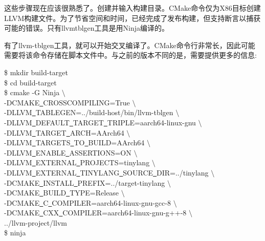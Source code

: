 这些步骤现在应该很熟悉了。创建并输入构建目录。CMake命令仅为X86目标创建LLVM构建文件。为了节省空间和时间，已经完成了发布构建，但支持断言以捕获可能的错误。只有llvmtblgen工具是用Ninja编译的。\par

有了llvm-tblgen工具，就可以开始交叉编译了。CMake命令行非常长，因此可能需要将该命令存储在脚本文件中。与之前的版本不同的是，需要提供更多的信息:\par

\begin{tcolorbox}[colback=white,colframe=black]
\$ mkdir build-target \\
\$ cd build-target \\
\$ cmake -G Ninja $\setminus$ \\
\hspace*{1cm}-DCMAKE\underline{~}CROSSCOMPILING=True $\setminus$ \\
\hspace*{1cm}-DLLVM\underline{~}TABLEGEN=../build-host/bin/llvm-tblgen $\setminus$ \\
\hspace*{1cm}-DLLVM\underline{~}DEFAULT\underline{~}TARGET\underline{~}TRIPLE=aarch64-linux-gnu $\setminus$ \\
\hspace*{1cm}-DLLVM\underline{~}TARGET\underline{~}ARCH=AArch64 $\setminus$ \\
\hspace*{1cm}-DLLVM\underline{~}TARGETS\underline{~}TO\underline{~}BUILD=AArch64 $\setminus$ \\
\hspace*{1cm}-DLLVM\underline{~}ENABLE\underline{~}ASSERTIONS=ON $\setminus$ \\
\hspace*{1cm}-DLLVM\underline{~}EXTERNAL\underline{~}PROJECTS=tinylang $\setminus$ \\
\hspace*{1cm}-DLLVM\underline{~}EXTERNAL\underline{~}TINYLANG\underline{~}SOURCE\underline{~}DIR=../tinylang $\setminus$ \\
\hspace*{1cm}-DCMAKE\underline{~}INSTALL\underline{~}PREFIX=../target-tinylang $\setminus$ \\	\hspace*{1cm}-DCMAKE\underline{~}BUILD\underline{~}TYPE=Release $\setminus$ \\
\hspace*{1cm}-DCMAKE\underline{~}C\underline{~}COMPILER=aarch64-linux-gnu-gcc-8 $\setminus$ \\
\hspace*{1cm}-DCMAKE\underline{~}CXX\underline{~}COMPILER=aarch64-linux-gnu-g++-8 $\setminus$ \\
\hspace*{1cm}../llvm-project/llvm \\
\$ ninja
\end{tcolorbox}

